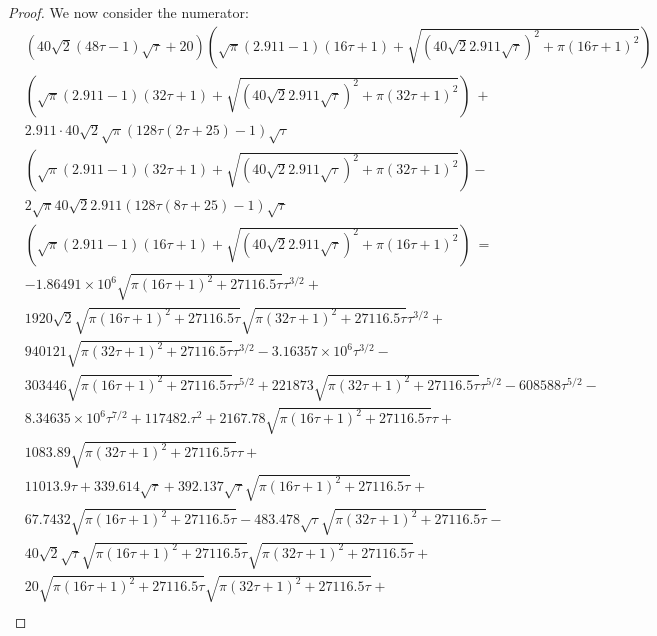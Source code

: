 \documentclass{article}
\begin{document}
\begin{proof}
We now consider the numerator:
\begin{align}
\label{eq:start1}
&\left(40 \sqrt{2} (48 \tau-1) \sqrt{\tau}+20\right) \left(\sqrt{\pi } (2.911 -1) (16 \tau+1)+\sqrt{\left(40 \sqrt{2} 2.911 \sqrt{\tau}\right)^2+\pi  (16 \tau+1)^2}\right) \\\nonumber
& \left(\sqrt{\pi } (2.911 -1) (32  \tau+1)+\sqrt{\left(40 \sqrt{2} 2.911 \sqrt{\tau}\right)^2+\pi  (32  \tau+1)^2}\right) \ +\\ \nonumber
&2.911 \cdot 40 \sqrt{2} \sqrt{\pi } (128 \tau (2  \tau+25)-1) \sqrt{\tau}  \\\nonumber 
&\left(\sqrt{\pi } (2.911 -1) (32  \tau+1)+\sqrt{\left(40 \sqrt{2} 2.911 \sqrt{\tau}\right)^2+\pi  (32  \tau+1)^2}\right)-\\ \nonumber 
&2 \sqrt{\pi } 40 \sqrt{2} 2.911 (128 \tau (8 \tau+25)-1) \sqrt{\tau} \\ \nonumber 
&\left(\sqrt{\pi } (2.911 -1) (16 \tau+1)+\sqrt{\left(40 \sqrt{2} 2.911 \sqrt{\tau}\right)^2+\pi  (16 \tau+1)^2}\right)\ = \\ \nonumber 
& -1.86491\times 10^6 \sqrt{\pi  (16 \tau+1)^2+27116.5 \tau} \tau^{3/2}+\\ \nonumber 
&1920 \sqrt{2} \sqrt{\pi  (16 \tau+1)^2+27116.5 \tau} \sqrt{\pi  (32  \tau+1)^2+27116.5 \tau} \tau^{3/2}+ \\ \nonumber 
&940121 \sqrt{\pi  (32  \tau+1)^2+27116.5 \tau} \tau^{3/2}-3.16357\times 10^6 \tau^{3/2}- \\ \nonumber 
&303446 \sqrt{\pi  (16 \tau+1)^2+27116.5 \tau} \tau^{5/2}+221873 \sqrt{\pi  (32  \tau+1)^2+27116.5 \tau} \tau^{5/2}-608588 \tau^{5/2}- \\ \nonumber 
&8.34635\times 10^6 \tau^{7/2}+117482. \tau^2+2167.78 \sqrt{\pi  (16 \tau+1)^2+27116.5 \tau} \tau+ \\ \nonumber 
&1083.89 \sqrt{\pi  (32  \tau+1)^2+27116.5 \tau} \tau+ \\ \nonumber 
&11013.9 \tau+339.614 \sqrt{\tau}+392.137 \sqrt{\tau} \sqrt{\pi  (16 \tau+1)^2+27116.5 \tau}+ \\ \nonumber 
&67.7432 \sqrt{\pi  (16 \tau+1)^2+27116.5 \tau}-483.478 \sqrt{\tau} \sqrt{\pi  (32  \tau+1)^2+27116.5 \tau}- \\ \nonumber 
&40 \sqrt{2} \sqrt{\tau} \sqrt{\pi  (16 \tau+1)^2+27116.5 \tau} \sqrt{\pi  (32  \tau+1)^2+27116.5 \tau}+ \\ \nonumber 
&20 \sqrt{\pi  (16 \tau+1)^2+27116.5 \tau} \sqrt{\pi  (32  \tau+1)^2+27116.5 \tau}+ \\ \nonumber 

\end{align}
\end{proof}
\end{document}
